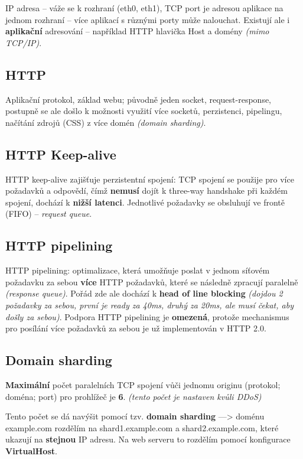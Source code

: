 IP adresa -- váže se k rozhraní (eth0, eth1), TCP port je adresou aplikace na jednom rozhraní -- více aplikací s různými porty může nalouchat. Existují ale i \textbf{aplikační} adresování -- například HTTP hlavička Host a domény \textit{(mimo TCP/IP)}.

\subsection{HTTP}

Aplikační protokol, základ webu; původně jeden socket, request-response, postupně se ale došlo k možnosti využití více socketů, perzistenci, pipelingu, načítání zdrojů (CSS) z více domén \textit{(domain sharding)}.

\subsection{HTTP Keep-alive}

HTTP keep-alive zajišťuje perzistentní spojení: TCP spojení se použije pro více požadavků a odpovědí, čímž \textbf{nemusí} dojít k three-way handshake při každém spojení, dochází k \textbf{nižší latenci}. Jednotlivé požadavky se obsluhují ve frontě (FIFO) – \textit{request queue}.

\subsection{HTTP pipelining}

HTTP pipelining: optimalizace, která umožňuje poslat v jednom síťovém požadavku za sebou \textbf{více} HTTP požadavků, které se následně zpracují paralelně \textit{(response queue)}. Pořád zde ale dochází k \textbf{head of line blocking} \textit{(dojdou 2 požadavky za sebou, první je ready za 40ms, druhý za 20ms, ale musí čekat, aby došly za sebou)}. Podpora HTTP pipelining je \textbf{omezená}, protože mechanismus pro posílání více požadavků za sebou je už implementován v HTTP 2.0.

\subsection{Domain sharding}

\textbf{Maximální} počet paralelních TCP spojení vůči jednomu originu (protokol; doména; port) pro prohlížeč je \textbf{6}. \textit{(tento počet je nastaven kvůli DDoS)}

Tento počet se dá navýšit pomocí tzv. \textbf{domain sharding} —> doménu example.com rozdělím na shard1.example.com a shard2.example.com, které ukazují na \textbf{stejnou} IP adresu. Na web serveru to rozdělím pomocí konfigurace \textbf{VirtualHost}.

